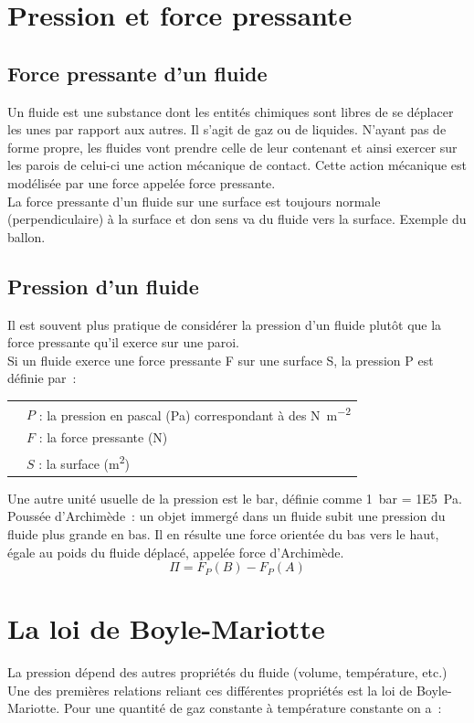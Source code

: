 \documentclass[a4paper,11pt,fleqn]{article}%
\begin{document}
\section{Pression et force pressante}
	\subsection{Force pressante d'un fluide}
	Un fluide est une substance dont les entités chimiques sont libres de se déplacer les unes par rapport aux autres. Il s'agit de gaz ou de liquides. N'ayant pas de forme propre, les fluides vont prendre celle de leur contenant et ainsi exercer sur les parois de celui-ci une action mécanique de contact. Cette action mécanique est modélisée par une force appelée force pressante.\\
	La force pressante d'un fluide sur une surface est toujours normale (perpendiculaire) à la surface et don sens va du fluide vers la surface.
	Exemple du ballon.
	
	\subsection{Pression d'un fluide}
	Il est souvent plus pratique de considérer la pression d'un fluide plutôt que la force pressante qu'il exerce sur une paroi.\\
	Si un fluide exerce une force pressante F sur une surface S, la pression P est définie par : 
	\begin{center}
		\begin{tabular}{>{\centering}m{.3\linewidth}|m{.6\linewidth}}
			\multirow{3}{*}{$P = \dfrac{F}{S}$} & $P$ :  la pression en pascal (\unit{\pascal}) correspondant à des \unit{\newton \per\meter\squared}\\
			&$F$ : la force pressante (\unit{\newton})\\
			& $S$ : la surface (\unit{\meter\squared})\\
		\end{tabular}
	\end{center}
	Une autre unité usuelle de la pression est le bar, définie comme \SI{1}{\bar} = \SI{1E5}{\pascal}.\\
	Poussée d'Archimède : un objet immergé dans un fluide subit une pression du fluide plus grande en bas. Il en résulte une force orientée du bas vers le haut, égale au poids du fluide déplacé, appelée force d'Archimède.
	$$\Pi = F_P(B) - F_P(A) $$
	
	\section{La loi de Boyle-Mariotte}
	La pression dépend des autres propriétés du fluide (volume, température, etc.) Une des premières relations reliant ces différentes propriétés est la loi de Boyle-Mariotte. Pour une quantité de gaz constante à température constante on a :
	
\end{document}
